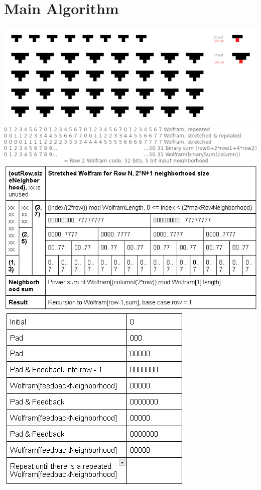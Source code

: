 \documentclass[11pt]{article}
\begin{document}
    \section{Main Algorithm}
    \begin{center}
        \includegraphics{StretchTemplate}\\
    \includegraphics{Stretch}\\
    \includegraphics{RuleStretch}\\
    \includegraphics{StretchFeedback}\\

        \end{center}
\end{document}
